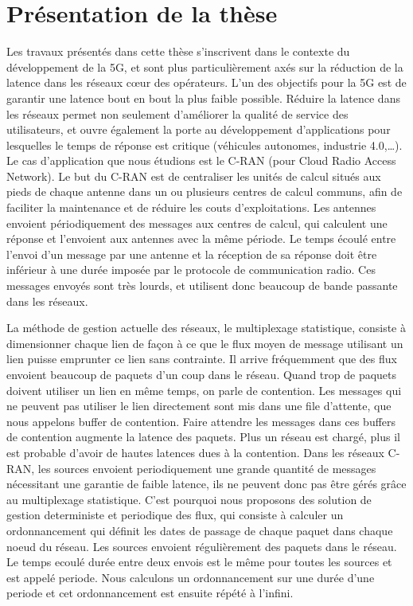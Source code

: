 
\chapter*{Présentation de la thèse}
\label{chap:introfr}


Les travaux présentés dans cette thèse s'inscrivent dans le contexte du développement de la 5G, et sont plus particulièrement axés sur la réduction de la latence dans les réseaux cœur des opérateurs.
L'un des objectifs pour la 5G est de garantir une latence bout en bout la plus faible possible.
Réduire la latence dans les réseaux permet non seulement d'améliorer la qualité de service des utilisateurs, et ouvre également la porte au développement d'applications pour lesquelles le temps de réponse est critique (véhicules autonomes, industrie 4.0,\ldots).
Le cas d'application que nous étudions est le C-RAN (pour Cloud Radio Access Network). Le but du C-RAN est de centraliser les unités de calcul situés aux pieds de chaque antenne dans un ou plusieurs centres de calcul communs, afin de faciliter la maintenance et de réduire les couts d'exploitations. Les antennes envoient périodiquement des messages aux centres de calcul, qui calculent une réponse et l'envoient aux antennes avec la même période. Le temps écoulé entre l'envoi d'un message par une antenne et la réception de sa réponse doit être inférieur à une durée imposée par le protocole de communication radio. Ces messages envoyés sont très lourds, et utilisent donc beaucoup de bande passante dans les réseaux.

La méthode de gestion actuelle des réseaux, le multiplexage statistique, consiste à dimensionner chaque lien de façon à ce que le flux moyen de message utilisant un lien puisse emprunter ce lien sans contrainte. Il arrive fréquemment que des flux envoient beaucoup de paquets d'un coup dans le réseau. Quand trop de paquets doivent utiliser un lien en même temps, on parle de contention. Les messages qui ne peuvent pas utiliser le lien directement sont mis dans une file d'attente, que nous appelons buffer de contention. Faire attendre les messages dans ces buffers de contention augmente la latence des paquets. Plus un réseau est chargé, plus il est probable d'avoir de hautes latences dues à la contention. Dans les réseaux C-RAN, les sources envoient periodiquement une grande quantité de messages nécessitant une garantie de faible latence, ils ne peuvent donc pas être gérés grâce au multiplexage statistique. C'est pourquoi nous proposons des solution de gestion deterministe et periodique des flux, qui consiste à calculer un ordonnancement qui définit les dates de passage de chaque paquet dans chaque noeud du réseau. Les sources envoient régulièrement des paquets dans le réseau. Le temps ecoulé durée entre deux envois est le même pour toutes les sources et est appelé periode. Nous calculons un ordonnancement sur une durée d'une periode et cet ordonnancement est ensuite répété à l'infini.

